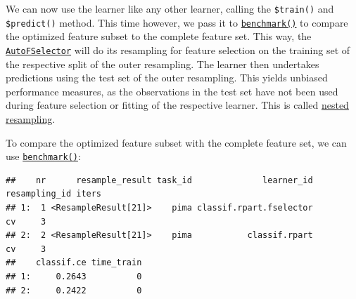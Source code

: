 \documentclass[
]{scrbook}
\newenvironment{Shaded}{\begin{snugshade}}{\end{snugshade}}
\newcommand{\AttributeTok}[1]{\textcolor[rgb]{0.77,0.63,0.00}{#1}}
\newcommand{\ConstantTok}[1]{\textcolor[rgb]{0.00,0.00,0.00}{#1}}
\newcommand{\DecValTok}[1]{\textcolor[rgb]{0.00,0.00,0.81}{#1}}
\newcommand{\FunctionTok}[1]{\textcolor[rgb]{0.00,0.00,0.00}{#1}}
\newcommand{\NormalTok}[1]{#1}
\newcommand{\OtherTok}[1]{\textcolor[rgb]{0.56,0.35,0.01}{#1}}
\newcommand{\SpecialCharTok}[1]{\textcolor[rgb]{0.00,0.00,0.00}{#1}}
\newcommand{\StringTok}[1]{\textcolor[rgb]{0.31,0.60,0.02}{#1}}
\renewenvironment{Shaded} {\begin{snugshade}\small} {\end{snugshade}}
\begin{document}
We can now use the learner like any other learner, calling the \texttt{\$train()} and \texttt{\$predict()} method.
This time however, we pass it to \href{https://mlr3.mlr-org.com/reference/benchmark.html}{\texttt{benchmark()}} to compare the optimized feature subset to the complete feature set.
This way, the \href{https://mlr3fselect.mlr-org.com/reference/AutoFSelector.html}{\texttt{AutoFSelector}} will do its resampling for feature selection on the training set of the respective split of the outer resampling.
The learner then undertakes predictions using the test set of the outer resampling.
This yields unbiased performance measures, as the observations in the test set have not been used during feature selection or fitting of the respective learner.
This is called \protect\hyperlink{nested-resampling}{nested resampling}.

To compare the optimized feature subset with the complete feature set, we can use \href{https://mlr3.mlr-org.com/reference/benchmark.html}{\texttt{benchmark()}}:

\begin{Shaded}
\end{Shaded}

\begin{verbatim}
##    nr      resample_result task_id              learner_id resampling_id iters
## 1:  1 <ResampleResult[21]>    pima classif.rpart.fselector            cv     3
## 2:  2 <ResampleResult[21]>    pima           classif.rpart            cv     3
##    classif.ce time_train
## 1:     0.2643          0
## 2:     0.2422          0
\end{verbatim}
\end{document}

